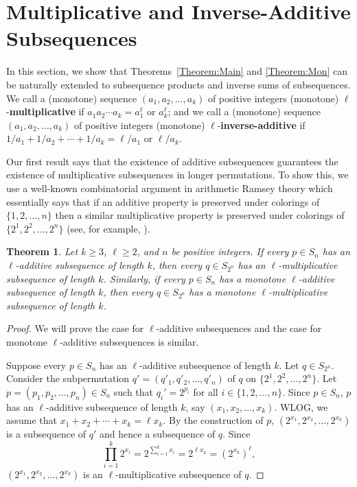 \documentclass[10pt,a4paper]{amsart}
\newtheorem{theorem}{Theorem}[section]
\begin{document}
\section{Multiplicative and Inverse-Additive Subsequences}\label{Section:Prod}
In this section, we show that Theorems~\ref{Theorem:Main} and \ref{Theorem:Mon} can be naturally extended to subsequence products and inverse sums of subsequences. We call a (monotone) sequence $(a_1,a_2,\ldots,a_k)$ of positive integers (monotone) $\ell$-\textbf{multiplicative} if $a_1a_2\cdots a_k=a_1^\ell$ or $a_k^\ell$; and we call a (monotone) sequence $(a_1,a_2,\ldots,a_k)$ of positive integers (monotone) $\ell$-\textbf{inverse-additive} if $1/a_1+1/a_2+\cdots+1/a_k=\ell/a_1$ or $\ell/a_k$.


Our first result says that the existence of additive subsequences guarantees the existence of multiplicative subsequences in longer permutations. To show this, we use a well-known combinatorial argument in arithmetic Ramsey theory which essentially says that if an additive property is preserved under colorings of $\{1,2,\ldots,n\}$ then a similar multiplicative property is preserved under colorings of $\{2^1,2^2,\ldots,2^n\}$ (see, for example, \cite{ACOS2025}).

\begin{theorem}\label{Theorem:MultiExistence}
Let $k\geq3$, $\ell\geq2$, and $n$ be positive integers. If every $p\in S_n$ has an $\ell$-additive subsequence of length $k$, then every $q\in S_{2^n}$ has an $\ell$-multiplicative subsequence of length $k$. Similarly, if every $p\in S_n$ has a monotone $\ell$-additive subsequence of length $k$, then every $q\in S_{2^n}$ has a monotone $\ell$-multiplicative subsequence of length $k$.
\end{theorem}
\begin{proof}
We will prove the case for $\ell$-additive subsequences and the case for monotone $\ell$-additive subsequences is similar.

    Suppose every $p\in S_n$ has an $\ell$-additive subsequence of length $k$. Let $q\in S_{2^n}$. Consider the subpermutation $q'=(q'_1,q'_2,\ldots,q'_n)$ of $q$ on $\{2^1, 2^2,\ldots,2^n\}$. Let $p=(p_1,p_2,\ldots,p_n)\in S_n$ such that $q_i' = 2^{p_i}$ for all $i\in\{1,2,\ldots,n\}$. Since $p\in S_n$, $p$ has an $\ell$-additive subsequence of length $k$, say $(x_1,x_2,\ldots,x_k)$. WLOG, we assume that $x_1+x_2+\cdots+x_k=\ell x_k$. By the construction of $p$, $(2^{x_1},2^{x_2},\ldots,2^{x_k})$ is a subsequence of $q'$ and hence a subsequence of $q$. Since
    \[
    \prod_{i=1}^k2^{x_i}=2^{\sum_{i=1}^kx_i}=2^{\ell x_k}=\left(2^{x_k}\right)^\ell,
    \]
    $(2^{x_1},2^{x_2},\ldots,2^{x_k})$ is an $\ell$-multiplicative subsequence of $q$.
\end{proof}
\end{document}
